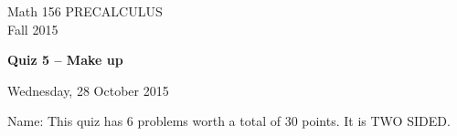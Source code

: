 \documentclass[11pt]{article}
\begin{document}
\begin{center}
\vspace{2in}

\huge{Math 156 PRECALCULUS \\
Fall 2015}

\vfill

\huge{\bf{Quiz 5 -- Make up}}\\

\vspace{0.5in}

\large{Wednesday, 28 October 2015}\\

\vfill


{\huge{Name:{\underline{\hspace{2in}}}}}
\vfill
This quiz has 6 problems worth a total of 30 points. It is TWO SIDED. 
\vfill
\end{center}
\newpage
\restoregeometry
\end{document}
